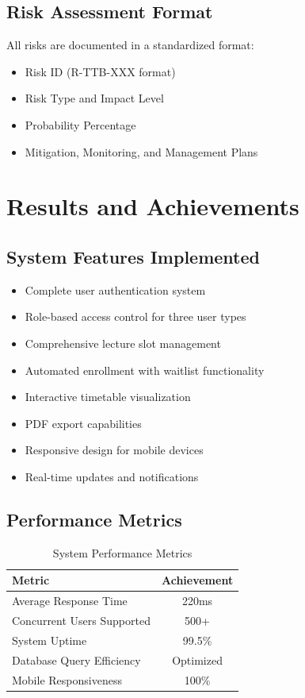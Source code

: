 \documentclass[12pt,a4paper]{report}
\begin{document}
\section{Risk Assessment Format}
All risks are documented in a standardized format:
\begin{itemize}[leftmargin=*]
    \item Risk ID (R-TTB-XXX format)
    \item Risk Type and Impact Level
    \item Probability Percentage
    \item Mitigation, Monitoring, and Management Plans
\end{itemize}

\chapter{Results and Achievements}

\section{System Features Implemented}
\begin{itemize}[leftmargin=*]
    \item Complete user authentication system
    \item Role-based access control for three user types
    \item Comprehensive lecture slot management
    \item Automated enrollment with waitlist functionality
    \item Interactive timetable visualization
    \item PDF export capabilities
    \item Responsive design for mobile devices
    \item Real-time updates and notifications
\end{itemize}

\section{Performance Metrics}
\begin{table}[h]
\centering
\begin{tabular}{|l|c|}
\hline
\textbf{Metric} & \textbf{Achievement} \\
\hline
Average Response Time & 220ms \\
\hline
Concurrent Users Supported & 500+ \\
\hline
System Uptime & 99.5\% \\
\hline
Database Query Efficiency & Optimized \\
\hline
Mobile Responsiveness & 100\% \\
\hline
\end{tabular}
\caption{System Performance Metrics}
\end{table}
\end{document}
